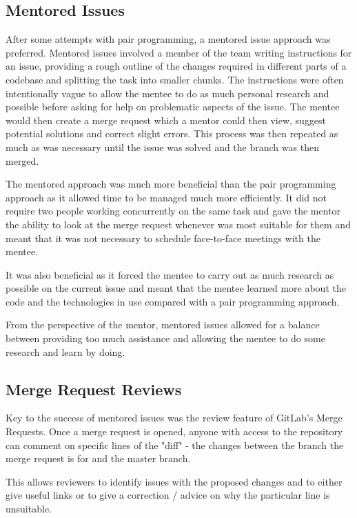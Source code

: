 \documentclass{l3proj}
\begin{document}
\subsection{Mentored Issues}
After some attempts with pair programming, a mentored issue approach was preferred. Mentored issues involved a member of the team writing instructions for an issue, providing a rough outline of the changes required in different parts of a codebase and splitting the task into smaller chunks. The instructions were often intentionally vague to allow the mentee to do as much personal research and possible before asking for help on problematic aspects of the issue. The mentee would then create a merge request which a mentor could then view, suggest potential solutions and correct slight errors. This process was then repeated as much as was necessary until the issue was solved and the branch was then merged.

The mentored approach was much more beneficial than the pair programming approach as it allowed time to be managed much more efficiently. It did not require two people working concurrently on the same task and gave the mentor the ability to look at the merge request whenever was most suitable for them and meant that it was not necessary to schedule face-to-face meetings with the mentee.

It was also beneficial as it forced the mentee to carry out as much research as possible on the current issue and meant that the mentee learned more about the code and the technologies in use compared with a pair programming approach.

From the perspective of the mentor, mentored issues allowed for a balance between providing too much assistance and allowing the mentee to do some research and learn by doing.

\subsection{Merge Request Reviews}
Key to the success of mentored issues was the review feature of GitLab's Merge Requests. Once a merge request is opened, anyone with access to the repository can comment on specific lines of the "diff" - the changes between the branch the merge request is for and the master branch.

This allows reviewers to identify issues with the proposed changes and to either give useful links or to give a correction / advice on why the particular line is unsuitable.
\end{document}
